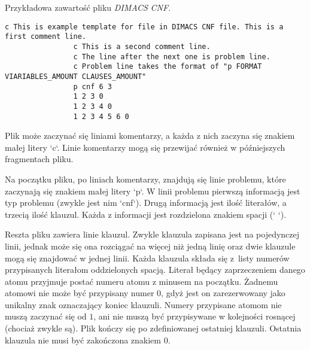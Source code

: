 	\begin{program}
			\caption{Przykładowa zawartość pliku \emph{DIMACS} \emph{CNF}.}\label{prog:DIMACSCNFsourceFile}
			\begin{lstlisting}[basicstyle=\scriptsize,]
                c This is example template for file in DIMACS CNF file. This is a first comment line.
                c This is a second comment line.
                c The line after the next one is problem line.
                c Problem line takes the format of "p FORMAT VIARIABLES_AMOUNT CLAUSES_AMOUNT"
                p cnf 6 3
                1 2 3 0
                1 2 3 4 0
                1 2 3 4 5 6 0
			\end{lstlisting}
	\end{program}	
	
	Plik może zaczynać się liniami komentarzy, a każda z nich zaczyna się znakiem małej litery `c`. Linie komentarzy mogą się przewijać również w późniejszych fragmentach pliku.
	
    Na początku pliku, po liniach komentarzy, znajdują się linie problemu, które zaczynają się znakiem małej litery `p`. W linii problemu pierwszą informacją jest typ problemu (zwykle jest nim `cnf`). Drugą informacją jest ilość literałów, a trzecią ilość klauzul. Każda z informacji jest rozdzielona znakiem spacji (` `).
	
	Reszta pliku zawiera linie klauzul. Zwykle klauzula zapisana jest na pojedynczej linii, jednak może się ona rozciągać na więcej niż jedną linię oraz dwie klauzule mogą się znajdować w jednej linii. Każda klauzula składa się z~listy numerów przypisanych literałom oddzielonych spacją. Literał będący zaprzeczeniem danego atomu przyjmuje postać numeru atomu z minusem na początku. Żadnemu atomowi nie może być przypisany numer $0$, gdyż jest on zarezerwowany jako unikalny znak oznaczający koniec klauzuli. Numery przypisane atomom nie muszą zaczynać się od $1$, ani nie muszą być przypisywane w kolejności rosnącej (chociaż zwykle są). Plik kończy się po zdefiniowanej ostatniej klauzuli. Ostatnia klauzula nie musi być zakończona znakiem $0$.
	



